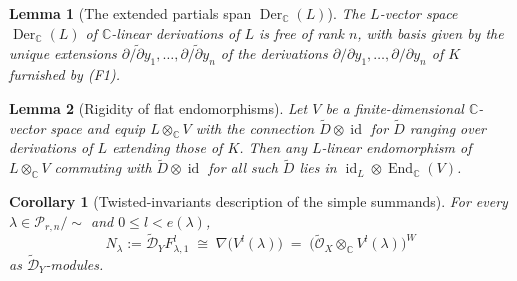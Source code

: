 \documentclass[10pt,a4paper]{amsart}
\newtheorem{lemma}{Lemma}
\newtheorem{corollary}{Corollary}
\begin{document}
\begin{lemma}[The extended partials span $\operatorname{Der}_{\mathbb{C}}(L)$]\label{lem:der-span}
The $L$-vector space $\operatorname{Der}_{\mathbb{C}}(L)$ of
$\mathbb{C}$-linear derivations of $L$ is free of rank $n$, with basis
given by the unique extensions
$\widetilde{\partial/\partial y_1},\dots,\widetilde{\partial/\partial y_n}$
of the derivations $\partial/\partial y_1,\dots,\partial/\partial y_n$
of $K$ furnished by (F1).
\end{lemma}

\begin{lemma}[Rigidity of flat endomorphisms]\label{lem:rigidity}
Let $V$ be a finite-dimensional $\mathbb{C}$-vector space and equip
$L \otimes_{\mathbb{C}} V$ with the connection
$\widetilde{D} \otimes \operatorname{id}$ for $\widetilde{D}$ ranging
over derivations of $L$ extending those of $K$. Then any $L$-linear
endomorphism of $L \otimes_{\mathbb{C}} V$ commuting with
$\widetilde{D} \otimes \operatorname{id}$ for all such $\widetilde{D}$
lies in $\operatorname{id}_L \otimes \operatorname{End}_{\mathbb{C}}(V)$.
\end{lemma}

\begin{corollary}[Twisted-invariants description of the simple summands]\label{cor:twisted-invariants}
For every $\lambda \in \mathcal{P}_{r,n}/\sim$ and $0 \le l < e(\lambda)$,
\[
  N_\lambda := \widetilde{\mathcal{D}}_Y F^l_{\lambda,1}
  \;\cong\; \nabla\big(V^l(\lambda)\big)
  \;=\; \big(\widetilde{\mathcal{O}}_X \otimes_{\mathbb{C}} V^l(\lambda)\big)^{W}
\]
as $\widetilde{\mathcal{D}}_Y$-modules.
\end{corollary}
\end{document}
